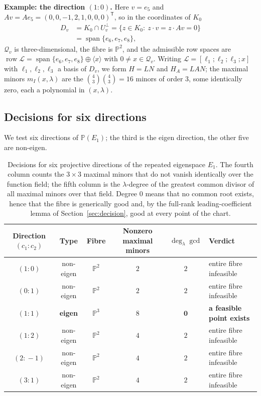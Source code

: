 \documentclass[journal]{IEEEtran}
\theoremstyle{plainn}
\theoremstyle{remark}
\newcommand{\row}{\operatorname{row}}
\begin{document}
\textbf{Example: the direction $(1\!:\!0)$.} Here $v=e_5$ and
$Av=Ae_5=(0,0,-1,2,1,0,0,0)^{\mathsf{T}}$, so in the coordinates of $K_0$
\begin{equation}\label{sec6:eq:Dv}
\begin{aligned}
D_v&=K_0\cap U_v^{\perp}=\{z\in K_0:\ z\cdot v=z\cdot Av=0\}\\
   &=\operatorname{span}\{e_6,e_7,e_8\},
\end{aligned}
\end{equation}
$\mathcal{Q}_v$ is three-dimensional, the fibre is $\mathbb{P}^{2}$, and the admissible row spaces are
$\row\mathcal{L}=\operatorname{span}\{e_6,e_7,e_8\}\oplus\langle x\rangle$ with
$0\neq x\in\mathcal{Q}_v$. Writing $\mathcal{L}=[\ell_1;\ell_2;\ell_3;x]$ with $\ell_1,\ell_2,\ell_3$ a
basis of $D_v$, we form $H=LN$ and $H_A=LAN$; the maximal minors $m_I(x,\lambda)$ are the
$\binom{4}{3}\binom{4}{3}=16$ minors of order $3$, some identically zero, each a polynomial in
$(x,\lambda)$.


\subsection{Decisions for six directions}\label{sec6:sub:six}


We test six directions of $\mathbb{P}(E_1)$; the third is the eigen direction, the other five are
non-eigen.

\begin{table}[t]
\centering
\caption{Decisions for six projective directions of the repeated eigenspace $E_1$. The fourth column
counts the $3\times3$ maximal minors that do not vanish identically over the function field; the fifth
column is the $\lambda$-degree of the greatest common divisor of all maximal minors over that field.
Degree $0$ means that no common root exists, hence that the fibre is generically good and, by the
full-rank leading-coefficient lemma of Section~\ref{sec:decision}, good at every point of the chart.}
\label{sec6:tab:dirs}
\begin{tabular}{@{}cccccl@{}}
\toprule
Direction $(c_1\!:\!c_2)$ & Type & Fibre & Nonzero maximal minors & $\deg_\lambda\gcd$ & Verdict\\
\midrule
$(1\!:\!0)$ & non-eigen & $\mathbb{P}^{2}$ & $2$ & $2$ & entire fibre infeasible\\
$(0\!:\!1)$ & non-eigen & $\mathbb{P}^{2}$ & $2$ & $2$ & entire fibre infeasible\\
$(1\!:\!1)$ & \textbf{eigen} & $\mathbb{P}^{3}$ & $8$ & $\mathbf{0}$ & \textbf{a feasible point exists}\\
$(1\!:\!2)$ & non-eigen & $\mathbb{P}^{2}$ & $4$ & $2$ & entire fibre infeasible\\
$(2\!:\!-1)$ & non-eigen & $\mathbb{P}^{2}$ & $4$ & $2$ & entire fibre infeasible\\
$(3\!:\!1)$ & non-eigen & $\mathbb{P}^{2}$ & $4$ & $2$ & entire fibre infeasible\\
\bottomrule
\end{tabular}
\end{table}
\end{document}
